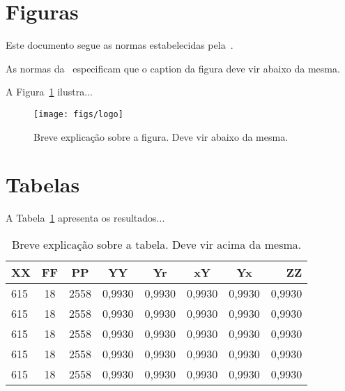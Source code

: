 
\section*{Figuras}\label{sec:figuras}

Este documento segue as normas estabelecidas pela~.

As normas da~ especificam que o caption da figura deve vir abaixo da mesma.

A Figura~\ref{fig:log} ilustra...

\begin{figure}[htpb]
   \centering
   \texttt{[image: figs/logo]}
   \caption{Breve explicação sobre a figura. Deve vir abaixo da mesma.}
   \label{fig:log}
\end{figure}

\section*{Tabelas}\label{sec:tabelas}

A Tabela~\ref{tab:tabela} apresenta os resultados...

\begin{table}[htpb]
   \centering
   \caption{Breve explicação sobre a tabela. Deve vir acima da mesma.}\label{tab:tabela}
   \begin{tabular}{|l|c|c|c|c|c|c|r|}
        \hline
        \small{XX} & \small{FF} & \small{PP} & \small{YY} & \small{Yr} & \small{xY} & \small{Yx} & \small{ZZ} \\ \hline
               615 &    18      &     2558   &    0,9930  &    0,9930  &    0,9930  &    0,9930  &    0,9930  \\ \hline
               615 &    18      &     2558   &    0,9930  &    0,9930  &    0,9930  &    0,9930  &    0,9930  \\ \hline
               615 &    18      &     2558   &    0,9930  &    0,9930  &    0,9930  &    0,9930  &    0,9930  \\ \hline
               615 &    18      &     2558   &    0,9930  &    0,9930  &    0,9930  &    0,9930  &    0,9930  \\ \hline
               615 &    18      &     2558   &    0,9930  &    0,9930  &    0,9930  &    0,9930  &    0,9930  \\ \hline
   \end{tabular}
\end{table}

